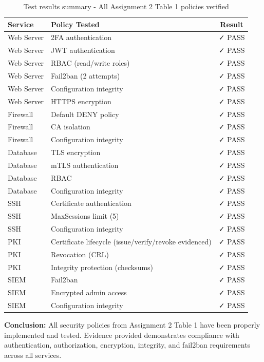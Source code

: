 \begin{table}[H]
\centering
\begin{tabular}{|l|l|c|}
\hline
\textbf{Service} & \textbf{Policy Tested} & \textbf{Result} \\
\hline
Web Server & 2FA authentication & ✓ PASS \\
Web Server & JWT authentication & ✓ PASS \\
Web Server & RBAC (read/write roles) & ✓ PASS \\
Web Server & Fail2ban (2 attempts) & ✓ PASS \\
Web Server & Configuration integrity & ✓ PASS \\
Web Server & HTTPS encryption & ✓ PASS \\
\hline
Firewall & Default DENY policy & ✓ PASS \\
Firewall & CA isolation & ✓ PASS \\
Firewall & Configuration integrity & ✓ PASS \\
\hline
Database & TLS encryption & ✓ PASS \\
Database & mTLS authentication & ✓ PASS \\
Database & RBAC & ✓ PASS \\
Database & Configuration integrity & ✓ PASS \\
\hline
SSH & Certificate authentication & ✓ PASS \\
SSH & MaxSessions limit (5) & ✓ PASS \\
SSH & Configuration integrity & ✓ PASS \\
\hline
PKI & Certificate lifecycle (issue/verify/revoke evidenced) & ✓ PASS \\
PKI & Revocation (CRL) & ✓ PASS \\
PKI & Integrity protection (checksums) & ✓ PASS \\
\hline
SIEM & Fail2ban & ✓ PASS \\
SIEM & Encrypted admin access & ✓ PASS \\
SIEM & Configuration integrity & ✓ PASS \\
\hline
\end{tabular}
\caption{Test results summary - All Assignment 2 Table 1 policies verified}
\end{table}

\textbf{Conclusion:} All security policies from Assignment 2 Table 1 have been properly implemented and tested. Evidence provided demonstrates compliance with authentication, authorization, encryption, integrity, and fail2ban requirements across all services.
